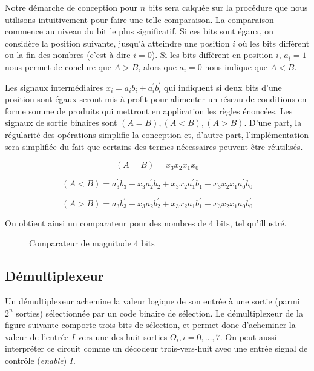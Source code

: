 \documentclass[11pt]{article}
\begin{document}
Notre démarche de conception pour \(n\) bits sera calquée sur la
procédure que nous utilisons intuitivement pour faire une telle
comparaison. La comparaison commence au niveau du bit le plus
significatif. Si ces bits sont égaux, on considère la position
suivante, jusqu'à atteindre une position \(i\) où les bits diffèrent
ou la fin des nombres (c'est-à-dire \(i=0\)). Si les bits diffèrent en
position \(i\), \(a_i = 1\) nous permet de conclure que \(A > B\),
alors que \(a_i = 0\) nous indique que \(A < B\).

Les signaux intermédiaires \(x_i = a_i b_i + a_i^\prime b_i^\prime\)
qui indiquent si deux bits d'une position sont égaux seront mis à
profit pour alimenter un réseau de conditions en forme somme de
produits qui mettront en application les règles énoncées. Les signaux
de sortie binaires sont \((A = B), (A < B), (A > B)\).  D'une part,
la régularité des opérations simplifie la conception et, d'autre part,
l'implémentation sera simplifiée du fait que certains des termes
nécessaires peuvent être réutilisés.

$$ (A = B) = x_3 x_2 x_1 x_0 $$ 

$$ (A < B) = a_3^\prime b_3 + x_3  a_2^\prime b_2  +  x_3 x_2  a_1^\prime b_1 +  x_3 x_2 x_1  a_0^\prime b_0 $$

$$ (A > B) = a_3 b_3^\prime + x_3  a_2 b_2^\prime  +  x_3 x_2  a_1 b_1^\prime +  x_3 x_2 x_1  a_0 b_0^\prime $$

On obtient ainsi un comparateur pour des nombres de 4 bits, tel qu'illustré.

\begin{figure}[htbp]
\centering

\caption{\label{fig:org4a6010f}Comparateur de magnitude 4 bits}
\end{figure}

\subsection{Démultiplexeur}
\label{sec:orgd25be44}

Un démultiplexeur achemine la valeur logique de son entrée à une
sortie (parmi \(2^n\) sorties) sélectionnée par un code binaire de
sélection. Le démultiplexeur de la figure suivante comporte trois bits
de sélection, et permet donc d'acheminer la valeur de l'entrée \(I\)
vers une des huit sorties \(O_i, i = 0, \ldots, 7\). On peut aussi
interpréter ce circuit comme un décodeur trois-vers-huit avec une
entrée signal de contrôle (\emph{enable}) \(I\).
\end{document}
